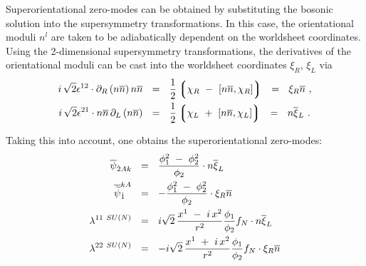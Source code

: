\documentclass{article}
\newcommand{\p}{\partial}
\newcommand{\wt}{\widetilde}
\newcommand{\ov}{\overline}
\newcommand{\lgr}{\left\lgroup}
\newcommand{\rgr}{\right\rgroup}
\newcommand{\bxil}{\ov{\xi}{}_L}
\newcommand{\xir}{\xi_R}
\newcommand{\xil}{\xi_L}
\newcommand{\nbar}{\ov{n}}
\begin{document}
Superorientational zero-modes can be obtained by substituting the bosonic solution into the supersymmetry
transformations. 
In this case, the orientational moduli $ n^l $ are taken to be adiabatically dependent on the worldsheet
coordinates. 
Using the 2-dimensional supersymmetry transformations, the derivatives of the orientational moduli can
be cast into the worldsheet coordinates $ \xir $, $ \xil $ via
\begin{align*}
%
	i\,\sqrt{2}\epsilon^{12} \cdot \p_R \left(n \nbar\right) n\nbar & ~~=~~ 
		\frac 1 2  \lgr \chi_R ~-~ \left[ n\nbar , \chi_R \right] \rgr
		~~=~~ \xi_R \nbar~,  \\
%
	i\, \sqrt{2} \epsilon^{21} \cdot n\nbar\, \p_L \left(n\nbar\right) & ~~=~~
		\frac 1 2 \lgr \chi_L ~+~ \left[ n\nbar, \chi_L \right] \rgr 
		~~=~~ n \bxil~.
\end{align*}

Taking this into account, one obtains the superorientational zero-modes:
\begin{align}
\label{N2_sorient}
%
\notag
\overline{\psi}_{\dot{2}Ak} & ~~=~~ \frac{\phi_1^2 ~-~ \phi_2^2}{\phi_2} \cdot n \overline{\xi}_L   \\
%
\notag
\overline{\wt{\psi}}_{\dot{1}}^{kA}  & ~~=~~ - \frac{\phi_1^2 ~-~ \phi_2^2}{\phi_2} \cdot \xi_R \nbar  \\
%
\lambda^{11\ SU(N)} & ~~=~~ i \sqrt{2}\, \frac{ x^1 ~-~ i\, x^2 }{r^2} \frac{\phi_1}{\phi_2} f_N \cdot n \overline{\xi}_L \\
%
\notag
\lambda^{22\ SU(N)} & ~~=~~ - i \sqrt{2}\, \frac{ x^1 ~+~ i\, x^2 }{r^2} \frac{\phi_1}{\phi_2} f_N \cdot \xi_R \nbar 
\end{align}
\end{document}
